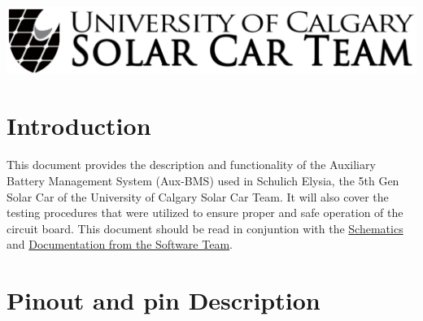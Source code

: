 \begin{titlepage}
    \includegraphics[width=\textwidth]{../../Images/Logos/logo-wide.png}\\[1cm] %
     
    
    \vfill %
  
  \end{titlepage}
  
  
  \tableofcontents
  \listoffigures
  \listoftables
  
  
  \section{Introduction}
  This document provides the description and functionality of the Auxiliary Battery Management System (Aux-BMS) used in Schulich Elysia, the 5th Gen Solar Car of the University of Calgary Solar Car Team.
  It will also cover the testing procedures that were utilized to ensure proper and safe operation of the circuit board.
  This document should be read in conjuntion with the \href{https://drive.google.com/drive/u/0/folders/1RuRFeXCH_df2QL6o7zRyYeLvdto-ttc6}{Schematics} and \href{https://github.com/UCSolarCarTeam/Epsilon-Embedded-Software/blob/master/Documentation/AuxBMS.adoc?fbclid=IwAR172uMpHtL8X5OH7NzIacaADQOfsAcYtxaQmT-veKxzl1v6rAvSl-hSCcg}{Documentation from the Software Team}.
  
  \section{Pinout and pin Description}
  
